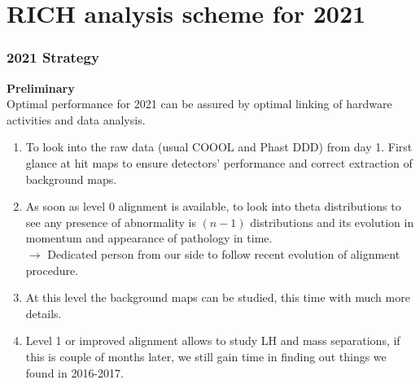\documentclass{beamer}
\begin{document}
\section{RICH analysis scheme for 2021}
\begin{frame}[allowframebreaks]
    \frametitle{2021 Strategy}
    \textbf{Preliminary}\\Optimal performance for 2021 can be assured by optimal linking of hardware activities and data analysis.
    \begin{enumerate}
        \item To look into the raw data (usual COOOL and Phast DDD) from day 1. First glance at hit maps to ensure detectors' performance and correct extraction of background maps.  \\
        \item As soon as level 0 alignment is available, to look into theta distributions to see any presence of abnormality is $(n-1)$ distributions and its evolution in momentum and appearance of pathology in time. \\
        $\rightarrow$ Dedicated person from our side to follow recent evolution of alignment procedure.
        \framebreak
        \item At this level the background maps can be studied, this time with much more details.
        \item Level 1 or improved alignment allows to study LH and mass separations, if this is couple of months later, we still gain time in finding out things we found in 2016-2017.   
    \end{enumerate}
\end{frame}
\end{document}
